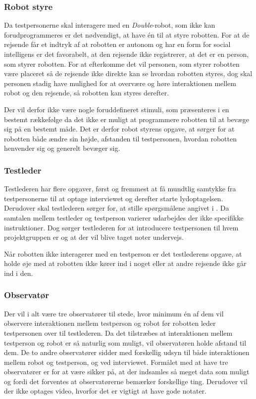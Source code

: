 \subsubsection*{Robot styre}
Da testpersonerne skal interagere med en \textit{Double}-robot, som ikke kan forudprogrammeres er det nødvendigt, at have én til at styre robotten. For at de rejsende får et indtryk af at robotten er autonom og har en form for social intelligens er det favorabelt, at den rejsende ikke registrerer, at det er en person, som styrer robotten. For at efterkomme det vil personen, som styrer robotten være placeret så de rejsende ikke direkte kan se hvordan robotten styres, dog skal personen stadig have mulighed for at overvære og høre interaktionen mellem robot og den rejsende, så robotten kan styres derefter.

Der vil derfor ikke være nogle foruddefineret stimuli, som præsenteres i en bestemt rækkefølge da det ikke er muligt at programmere robotten til at bevæge sig på en bestemt måde. Det er derfor robot styrens opgave, at sørger for at robotten både ændre sin højde, afstanden til testpersonen, hvordan robotten henvender sig og generelt bevæger sig.   

\subsubsection*{Testleder}
Testlederen har flere opgaver, først og fremmest at få mundtlig samtykke fra testpersonerne til at optage interviewet og derefter starte lydoptagelsen. Derudover skal testlederen sørger for, at stille spørgsmålene angivet i . Da samtalen mellem testleder og testperson varierer udarbejdes der ikke specifikke instruktioner. Dog sørger testlederen for at introducere testpersonen til hvem projektgruppen er og at der vil blive taget noter undervejs. 

Når robotten ikke interagerer med en testperson er det testlederens opgave, at holde øje med at robotten ikke kører ind i noget eller at andre rejsende ikke går ind i den.    

\subsubsection*{Observatør}
Der vil i alt være tre observatører til stede, hvor minimum én af dem vil observere interaktionen mellem testperson og robot før robotten leder testpersonen over til testlederen. Da det tilstræbes at interaktionen mellem testperson og robot er så naturlig som muligt, vil observatøren holde afstand til dem. De to andre observatører sidder med forskellig udsyn til både interaktionen mellem robot og testperson, og ved interviewet. Formålet med at have tre observatører er for at være sikker på, at der indsamles så meget data som muligt og fordi det forventes at observatørerne bemærker forskellige ting. Derudover vil der ikke optages video, hvorfor det er vigtigt at have gode notater. 

